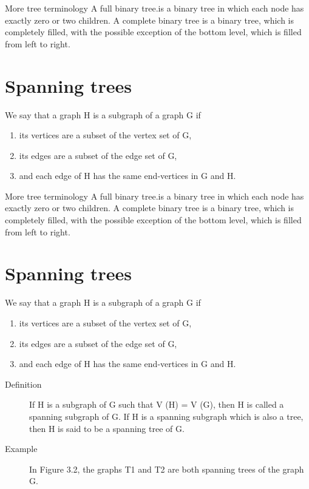 \documentclass[]{report}
\begin{document}

More tree terminology
A full binary tree.is a binary tree in which each node has exactly zero or two children.
A complete binary tree is a binary tree, which is completely filled, with the possible exception of the bottom level, which is filled from left to right.


\section{Spanning trees}
We say that a graph H is a subgraph of a graph G if

\begin{enumerate}
\item its vertices are
a subset of the vertex set of G, 
\item its edges are a subset of the edge set
of G, 
\item and each edge of H has the same end-vertices in G and H.
\end{enumerate} 


More tree terminology
A full binary tree.is a binary tree in which each node has exactly zero or two children.
A complete binary tree is a binary tree, which is completely filled, with the possible exception of the bottom level, which is filled from left to right.


\section{Spanning trees}
We say that a graph H is a subgraph of a graph G if

\begin{enumerate}
\item its vertices are
a subset of the vertex set of G, 
\item its edges are a subset of the edge set
of G, 
\item and each edge of H has the same end-vertices in G and H.
\end{enumerate} 


\begin{description}
\item[Definition]  If H is a subgraph of G such that V (H) = V (G), then H
is called a spanning subgraph of G. If H is a spanning subgraph
which is also a tree, then H is said to be a spanning tree of G.

\item[Example] In Figure 3.2, the graphs T1 and T2 are both spanning
trees of the graph G.
\end{description}
\end{document}
